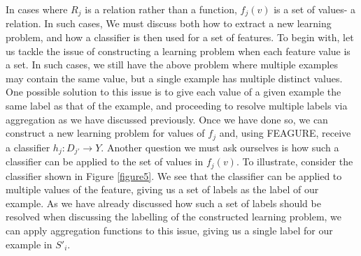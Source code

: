 \documentclass[twoside,11pt]{article}
\theoremstyle{definition}
\begin{document}
 In cases where $R_j$ is a relation rather than a function, $f_j(v)$ is a set of values- a relation. In such cases, We must discuss both how to extract a new learning problem, and how a classifier is then used for a set of features.
 To begin with, let us tackle the issue of constructing a learning problem when each feature value is a set. In such cases, we still have the above problem where multiple examples may contain the same value, but a single example has multiple distinct values. One possible solution to this issue is to give each value of a given example the same label as that of the example, and proceeding to resolve multiple labels via aggregation as we have discussed previously. 
 Once we have done so, we can construct a new learning problem for values of $f_j$ and, using FEAGURE, receive a classifier $h_j:D_{j'}\rightarrow Y$.
 Another question we must ask ourselves is how such a classifier can be applied to the set of values in $f_j(v)$. To illustrate, consider the classifier shown in Figure \ref{figure5}. We see that the classifier can be applied to multiple values of the feature, giving us a set of labels as the label of our example. As we have already discussed how such a set of labels should be resolved when discussing the labelling of the constructed learning problem, we can apply aggregation functions to this issue, giving us a single label for our example in $S'_i$.
\end{document}
